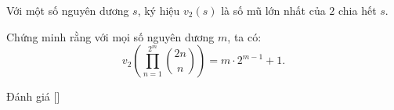\ifshowproblem
\begin{problem}\label{problem:BMO-2015-P5}
    Với một số nguyên dương \( s \), ký hiệu \( v_2(s) \) là số mũ lớn nhất của \( 2 \) chia hết \( s \).

    Chứng minh rằng với mọi số nguyên dương \( m \), ta có:
    \[
        v_2\left( \prod_{n=1}^{2^m} \binom{2n}{n} \right) = m \cdot 2^{m-1} + 1.
    \]
\end{problem}
\fi

\ifshowinfo
Đánh giá [\textbf{}]\footnotemark
{}
\fi